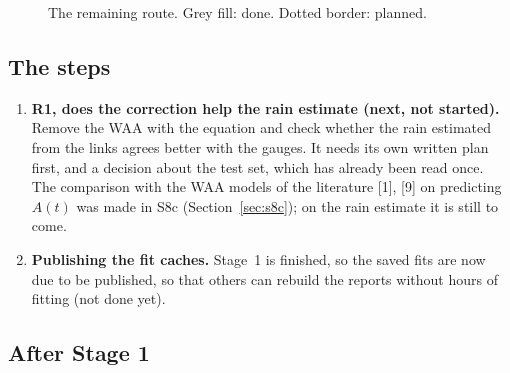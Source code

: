 \documentclass[11pt,a4paper]{article}
\newcommand{\Rbar}{\bar{R}}
\begin{document}
\begin{figure}[H]
\centering
{}
\caption{The remaining route. Grey fill: done. Dotted border: planned.}
\label{fig:plan}
\end{figure}

\subsection{The steps}

\begin{enumerate}
\item \textbf{R1, does the correction help the rain estimate (next, not started).} Remove the WAA with the equation and
check whether the rain estimated from the links agrees better with the gauges. It needs its own written plan first,
and a decision about the test set, which has already been read once. The comparison with the WAA models of the
literature [1], [9] on predicting $A(t)$ was made in S8c (Section~\ref{sec:s8c}); on the rain estimate it is still to come.
\item \textbf{Publishing the fit caches.} Stage~1 is finished, so the saved fits are now due to be published, so that
others can rebuild the reports without hours of fitting (not done yet).
\end{enumerate}

\subsection{After Stage 1}
\end{document}
